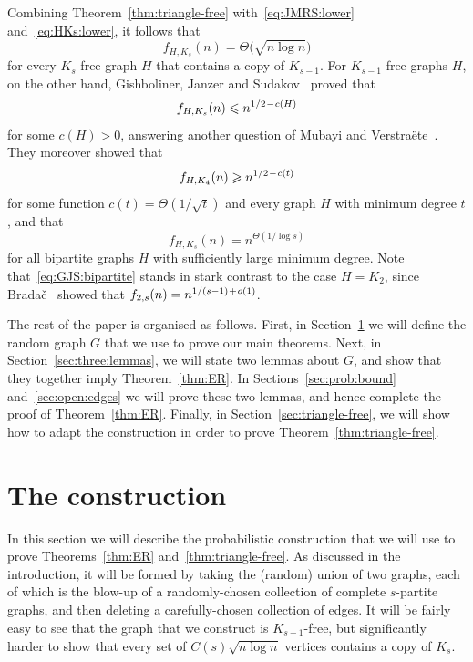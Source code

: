 \documentclass[12pt,reqno]{amsart}
\theoremstyle{remark}
\numberwithin{theorem}{section}
\renewcommand{\(}{\bigl(}
\renewcommand{\)}{\bigr)\vphantom{)}}
\newcommand{\p}{\hspace{0.02cm}+\hspace{0.02cm}}
\newcommand{\m}{\hspace{0.02cm}-\hspace{0.02cm}}
\renewcommand{\le}{\leqslant}
\renewcommand{\ge}{\geqslant}
\begin{document}
Combining Theorem~\ref{thm:triangle-free} with~\eqref{eq:JMRS:lower} and~\eqref{eq:HKs:lower}, it follows that
$$f_{H,K_{s}}(n) = \Theta\big( \sqrt{n\log n} \big)$$
for every $K_{s}$-free graph $H$ that contains a copy of $K_{s-1}$.  For $K_{s-1}$-free graphs $H$, on the other hand, Gishboliner, Janzer and Sudakov~\cite{GJS25} proved that
$$f_{H,K_{s}}(n) \le n^{1/2 \m c(H)}$$
for some $c(H) > 0$, answering another question of Mubayi and Verstra\"{e}te~\cite[Problem~2]{MV24b}. They moreover showed that
$$f_{H,K_4}(n) \ge n^{1/2 \m c(t)}$$
for some function $c(t) = \Theta(1/\sqrt{t})$ and every graph $H$ with minimum degree $t$, and that 
\begin{equation}\label{eq:GJS:bipartite}
f_{H,K_s}(n) = n^{\Theta(1/ \log s)}
\end{equation}
for all bipartite graphs $H$ with sufficiently large minimum degree. Note that~\eqref{eq:GJS:bipartite} stands in stark contrast to the case $H = K_2$, since Brada\v{c}~\cite{Br26} showed that $f_{2,s}(n) = n^{1/(s-1) \p o(1)}$.

The rest of the paper is organised as follows. First, in Section~\ref{sec:construction} we will define the random graph $G$ that we use to prove our main theorems. Next, in Section~\ref{sec:three:lemmas}, we will state two lemmas about $G$, and show that they together imply Theorem~\ref{thm:ER}. In Sections~\ref{sec:prob:bound} and~\ref{sec:open:edges} we will prove these two lemmas, and hence complete the proof of Theorem~\ref{thm:ER}. Finally, in Section~\ref{sec:triangle-free}, we will show how to adapt the construction in order to prove Theorem~\ref{thm:triangle-free}.





\section{The construction}\label{sec:construction}

In this section we will describe the probabilistic construction that we will use to prove Theorems~\ref{thm:ER} and~\ref{thm:triangle-free}. As discussed in the introduction, it will be formed by taking the (random) union of two graphs, each of which is the blow-up of a randomly-chosen collection of complete $s$-partite graphs, %
and then deleting a carefully-chosen collection of edges. It will be fairly easy to see that the graph that we construct is $K_{s+1}$-free, but significantly harder to show that every set of $C(s) \displaystyle{\sqrt{n \log n}}$ vertices contains a copy of $K_s$.
\end{document}
